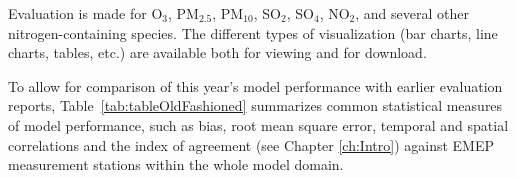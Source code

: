 Evaluation is made for O$_{3}$, PM$_{2.5}$, PM$_{10}$, SO$_{2}$, SO$_{4}$,
NO$_{2}$, and several other nitrogen-containing species.
The different types of visualization (bar charts, line charts, tables,
etc.) are available both for viewing and for download.

\vspace{1cm}

To allow for comparison of this year's model performance with earlier evaluation reports, Table~\ref{tab:tableOldFashioned} summarizes common statistical measures of model performance, such as bias, root mean square error, temporal and spatial correlations and the index of agreement (see Chapter \ref{ch:Intro}) against EMEP measurement stations within the whole model domain.

\begin{table}\small



\end{table}
